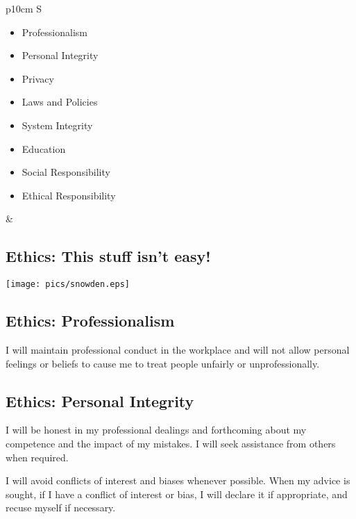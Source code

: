 \documentclass[xga]{xdvislides}
\begin{document}
\begin{tabular}{ p{10cm} S }
\begin{itemize}
	\item Professionalism
	\item Personal Integrity
	\item Privacy
	\item Laws and Policies
	\item System Integrity
	\item Education
	\item Social Responsibility
	\item Ethical Responsibility
\end{itemize}
&  \\
\end{tabular}

\subsection{Ethics: This stuff isn't easy!}
\begin{center}
	\texttt{[image: pics/snowden.eps]}
\end{center}

\subsection{Ethics: Professionalism}
\vfill
\begin{center}
I will maintain professional conduct in the workplace and will not allow
personal feelings or beliefs to cause me to treat people unfairly or
unprofessionally.
\end{center}
\vfill

\subsection{Ethics: Personal Integrity}
\vfill
\begin{center}
I will be honest in my professional dealings and forthcoming about my
competence and the impact of my mistakes. I will seek assistance from
others when required. \\
\vspace{.5in}

I will avoid conflicts of interest and biases whenever possible. When my
advice is sought, if I have a conflict of interest or bias, I will declare
it if appropriate, and recuse myself if necessary.
\end{center}
\vfill
\end{document}
